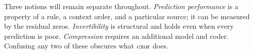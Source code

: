 Three notions will remain separate throughout.  \emph{Prediction performance} is a property of a
rule, a context order, and a particular source; it can be measured by the residual zeros.
\emph{Invertibility} is structural and holds even when every prediction is poor.
\emph{Compression} requires an additional model and coder.  Confusing any two of these obscures
what $\mathrm{cxor}$ does.
